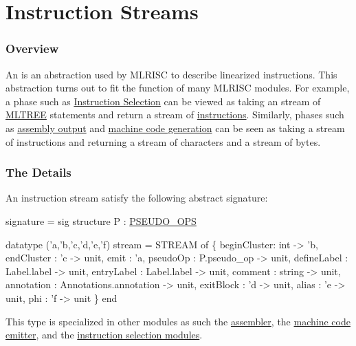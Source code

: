 \section{Instruction Streams}

\subsubsection{Overview}
An 
is an abstraction used by MLRISC to describe linearized instructions.
This abstraction turns out to fit the function of
many MLRISC modules.  For example,
a phase such as \href{instrsel.html}{Instruction Selection} 
can be viewed as taking an stream of 
\href{mltree.html}{MLTREE} statements and return a
stream of \href{instructions.html}{instructions}.  Similarly,
phases such as \href{asm.html}{assembly output} and
\href{mc.html}{machine code generation} can be seen 
as taking a stream of instructions and 
returning a stream of characters and a stream of bytes.

\subsubsection{The Details}
An instruction stream satisfy the following abstract signature:
\begin{SML}
signature  =
sig
   structure P : \href{pseudo-ops.html}{PSEUDO_OPS}

   datatype ('a,'b,'c,'d,'e,'f) stream =
      STREAM of
      \{ beginCluster: int -> 'b,  
        endCluster  : 'c -> unit, 
        emit        : 'a,        
        pseudoOp    : P.pseudo_op -> unit,
        defineLabel : Label.label -> unit,
        entryLabel  : Label.label -> unit,
        comment     : string -> unit,    
        annotation  : Annotations.annotation -> unit,
        exitBlock   : 'd -> unit,
        alias       : 'e -> unit, 
        phi         : 'f -> unit  
      \}
end
\end{SML}
This type is specialized in other modules as such the
\href{asm.html}{assembler}, the \href{mc.html}{machine code emitter},
and the \href{instrsel.html}{instruction selection modules}.
